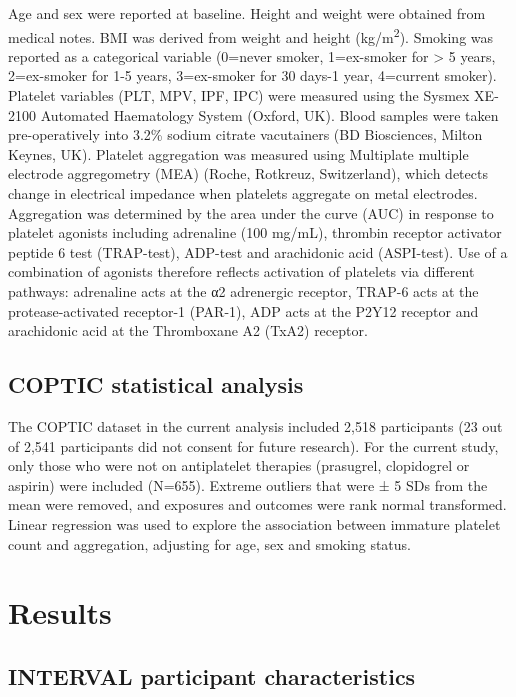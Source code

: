 \documentclass[11pt,twoside]{bristolthesis}
\begin{document}
Age and sex were reported at baseline. Height and weight were obtained from medical notes. BMI was derived from weight and height (kg/m\textsuperscript{2}). Smoking was reported as a categorical variable (0=never smoker, 1=ex-smoker for \textgreater{} 5 years, 2=ex-smoker for 1-5 years, 3=ex-smoker for 30 days-1 year, 4=current smoker). Platelet variables (PLT, MPV, IPF, IPC) were measured using the Sysmex XE-2100 Automated Haematology System (Oxford, UK). Blood samples were taken pre-operatively into 3.2\% sodium citrate vacutainers (BD Biosciences, Milton Keynes, UK). Platelet aggregation was measured using Multiplate multiple electrode aggregometry (MEA) (Roche, Rotkreuz, Switzerland), which detects change in electrical impedance when platelets aggregate on metal electrodes. Aggregation was determined by the area under the curve (AUC) in response to platelet agonists including adrenaline (100 mg/mL), thrombin receptor activator peptide 6 test (TRAP-test), ADP-test and arachidonic acid (ASPI-test). Use of a combination of agonists therefore reflects activation of platelets via different pathways: adrenaline acts at the α2 adrenergic receptor, TRAP-6 acts at the protease-activated receptor-1 (PAR-1), ADP acts at the P2Y12 receptor and arachidonic acid at the Thromboxane A2 (TxA2) receptor.

\hypertarget{coptic-statistical-analysis}{%
\subsection{COPTIC statistical analysis}\label{coptic-statistical-analysis}}

The COPTIC dataset in the current analysis included 2,518 participants (23 out of 2,541 participants did not consent for future research). For the current study, only those who were not on antiplatelet therapies (prasugrel, clopidogrel or aspirin) were included (N=655). Extreme outliers that were ± 5 SDs from the mean were removed, and exposures and outcomes were rank normal transformed. Linear regression was used to explore the association between immature platelet count and aggregation, adjusting for age, sex and smoking status.

\hypertarget{results}{%
\section{Results}\label{results}}

\hypertarget{interval-participant-characteristics}{%
\subsection{INTERVAL participant characteristics}\label{interval-participant-characteristics}}
\end{document}
